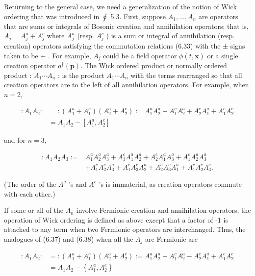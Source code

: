 \documentclass[10pt, letterpaper]{article}
\begin{document}
Returning to the general case, we need a generalization of the notion of Wick ordering that was introduced in $\oint$ 5.3. First, suppose $A_{1}, \ldots, A_{n}$ are operators that are sums or integrals of Bosonic creation and annihilation operators; that is, $A_{j}= A_{j}^{a}+A_{j}^{c}$ where $A_{j}^{a}$ (resp. $A_{j}^{c}$ ) is a sum or integral of annihilation (resp. creation) operators satisfying the commutation relations (6.33) with the ± signs taken to be + . For example, $A_{j}$ could be a field operator $\phi(t, \mathbf{x})$ or a single creation operator $a^{\dagger}(\mathbf{p})$. The Wick ordered product or normally ordered product : $A_{1} \cdots A_{n}$ : is the product $A_{1} \cdots A_{n}$ with the terms rearranged so that all creation operators are to the left of all annihilation operators. For example, when $n=2$,

$$
\begin{aligned}
: A_{1} A_{2}: & =:\left(A_{1}^{a}+A_{1}^{c}\right)\left(A_{2}^{a}+A_{2}^{c}\right):=A_{1}^{a} A_{2}^{a}+A_{1}^{c} A_{2}^{a}+A_{2}^{c} A_{1}^{a}+A_{1}^{c} A_{2}^{c} \\
& =A_{1} A_{2}-\left[A_{1}^{a}, A_{2}^{c}\right]
\end{aligned}
$$

and for $n=3$,

$$
\begin{aligned}
: A_{1} A_{2} A_{3}:= & A_{1}^{a} A_{2}^{a} A_{3}^{a}+A_{3}^{c} A_{1}^{a} A_{2}^{a}+A_{2}^{c} A_{1}^{a} A_{3}^{a}+A_{1}^{c} A_{2}^{a} A_{3}^{a} \\
& +A_{1}^{c} A_{2}^{c} A_{3}^{a}+A_{1}^{c} A_{3}^{c} A_{2}^{a}+A_{2}^{c} A_{3}^{c} A_{1}^{a}+A_{1}^{c} A_{2}^{c} A_{3}^{c} .
\end{aligned}
$$

(The order of the $A^{a}$ 's and $A^{c}$ 's is immaterial, as creation operators commute with each other.)

If some or all of the $A_{n}$ involve Fermionic creation and annihilation operators, the operation of Wick ordering is defined as above except that a factor of -1 is attached to any term when two Fermionic operators are interchanged. Thus, the analogues of (6.37) and (6.38) when all the $A_{j}$ are Fermionic are

$$
\begin{aligned}
: A_{1} A_{2}: & =:\left(A_{1}^{a}+A_{1}^{c}\right)\left(A_{2}^{a}+A_{2}^{c}\right):=A_{1}^{a} A_{2}^{a}+A_{1}^{c} A_{2}^{a}-A_{2}^{c} A_{1}^{a}+A_{1}^{c} A_{2}^{c} \\
& =A_{1} A_{2}-\left\{A_{1}^{a}, A_{2}^{c}\right\}
\end{aligned}
$$
\end{document}
